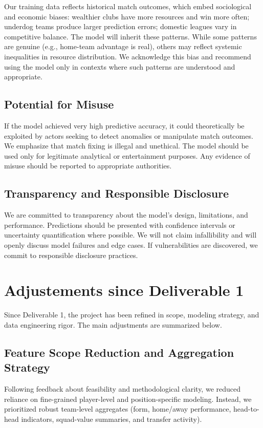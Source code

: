 \documentclass{article}
\begin{document}
Our training data reflects historical match outcomes, which embed sociological and economic biases: wealthier clubs have more resources and win more often; underdog teams produce larger prediction errors; domestic leagues vary in competitive balance. The model will inherit these patterns. While some patterns are genuine (e.g., home-team advantage is real), others may reflect systemic inequalities in resource distribution. We acknowledge this bias and recommend using the model only in contexts where such patterns are understood and appropriate.

\subsection{Potential for Misuse}

If the model achieved very high predictive accuracy, it could theoretically be exploited by actors seeking to detect anomalies or manipulate match outcomes. We emphasize that match fixing is illegal and unethical. The model should be used only for legitimate analytical or entertainment purposes. Any evidence of misuse should be reported to appropriate authorities.

\subsection{Transparency and Responsible Disclosure}

We are committed to transparency about the model's design, limitations, and performance. Predictions should be presented with confidence intervals or uncertainty quantification where possible. We will not claim infallibility and will openly discuss model failures and edge cases. If vulnerabilities are discovered, we commit to responsible disclosure practices.

\section{Adjustements since Deliverable 1}

Since Deliverable 1, the project has been refined in scope, modeling strategy, and data engineering rigor. The main adjustments are summarized below.

\subsection{Feature Scope Reduction and Aggregation Strategy}

Following feedback about feasibility and methodological clarity, we reduced reliance on fine-grained player-level and position-specific modeling. Instead, we prioritized robust team-level aggregates (form, home/away performance, head-to-head indicators, squad-value summaries, and transfer activity).
\end{document}
